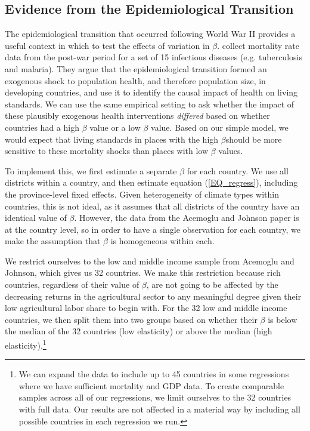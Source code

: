 \documentclass[11pt]{article}
\begin{document}
\subsection{Evidence from the Epidemiological Transition}\label{SEC_ajtest}
The epidemiological transition that occurred following World War II provides a useful context in which to test the effects of variation in $\beta$. \cite{aj07} collect mortality rate data from the post-war period for a set of 15 infectious diseases (e.g. tuberculosis and malaria). They argue that the epidemiological transition formed an exogenous shock to population health, and therefore population size, in developing countries, and use it to identify the causal impact of health on living standards. We can use the same empirical setting to ask whether the impact of these plausibly exogenous health interventions \textit{differed} based on whether countries had a high $\beta$ value or a low $\beta$ value. Based on our simple model, we would expect that living standards in places with the high $\beta$should be more sensitive to these mortality shocks than places with low $\beta$ values.

To implement this, we first estimate a separate $\beta$ for each country. We use all districts within a country, and then estimate equation (\ref{EQ_regress}), including the province-level fixed effects. Given heterogeneity of climate types within countries, this is not ideal, as it assumes that all districts of the country have an identical value of $\beta$. However, the data from the Acemoglu and Johnson paper is at the country level, so in order to have a single observation for each country, we make the assumption that $\beta$ is homogeneous within each.

We restrict ourselves to the low and middle income sample from Acemoglu and Johnson, which gives us 32 countries. We make this restriction because rich countries, regardless of their value of $\beta$, are not going to be affected by the decreasing returns in the agricultural sector to any meaningful degree given their low agricultural labor share to begin with. For the 32 low and middle income countries, we then split them into two groups based on whether their $\beta$ is below the median of the 32 countries (low elasticity) or above the median (high elasticity).\footnote{We can expand the data to include up to 45 countries in some regressions where we have sufficient mortality and GDP data. To create comparable samples across all of our regressions, we limit ourselves to the 32 countries with full data. Our results are not affected in a material way by including all possible countries in each regression we run.}
\end{document}
